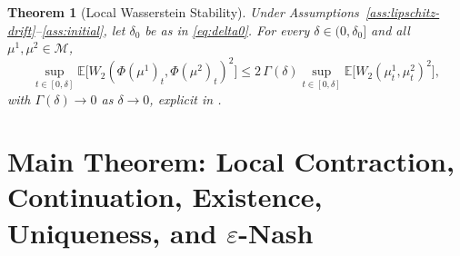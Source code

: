 \documentclass[11pt]{article}
\newtheorem{theorem}{Theorem}[section]
\theoremstyle{remark}
\begin{document}
\begin{theorem}[Local Wasserstein Stability]
\label{thm:stability}
Under Assumptions~\ref{ass:lipschitz-drift}--\ref{ass:initial}, let $\delta_0$ be as
in \eqref{eq:delta0}. For every $\delta \in (0,\delta_0]$ and all $\mu^1,\mu^2 \in
\mathcal{M}$,
\begin{equation}
    \sup_{t\in[0,\delta]} \mathbb{E}\big[W_2(\Phi(\mu^1)_t,\Phi(\mu^2)_t)^2\big] \le
    2\,\Gamma(\delta) \sup_{t\in[0,\delta]}
    \mathbb{E}\big[W_2(\mu_t^1,\mu_t^2)^2\big],
    \label{eq:stability-estimate}
\end{equation}
with $\Gamma(\delta) \to 0$ as $\delta \to 0$, explicit in
.
\end{theorem}

\section{Main Theorem: Local Contraction, Continuation, Existence, Uniqueness, and
$\varepsilon$-Nash}
\label{sec:main}
\end{document}
